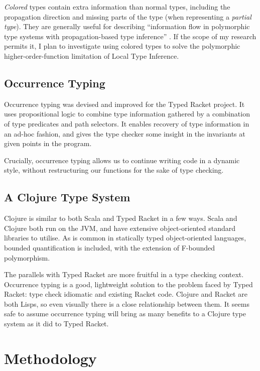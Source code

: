 \documentclass[12pt,a4paper]{article}
\begin{document}
\emph{Colored} types contain extra information than normal types, including the propagation direction
and missing parts of the type (when representing a \emph{partial type}). They are generally useful
for describing ``information flow in polymorphic type systems with propagation-based type inference''
\cite{Odersky:2001:CLT:373243.360207}. If the scope of my research permits it, I plan to investigate
using colored types to solve the polymorphic higher-order-function limitation of Local Type Inference.

\subsection{Occurrence Typing}

Occurrence typing was devised \cite{Tobin-Hochstadt:2008:DIT:1328897.1328486} and improved
\cite{Tobin-Hochstadt:2010:LTU:1932681.1863561} for the Typed Racket project. It uses propositional 
logic to combine type information gathered by a combination of type predicates and path selectors.
It enables recovery of type information in an ad-hoc fashion, and gives the type checker some insight
in the invariants at given points in the program.

Crucially, occurrence typing allows us to continue writing code in a dynamic style, without restructuring
our functions for the sake of type checking. 

\subsection{A Clojure Type System}

Clojure is similar to both Scala and Typed Racket in a few ways. Scala and Clojure
both run on the JVM, and have extensive object-oriented standard libraries to utilise.
As is common in statically typed object-oriented languages, bounded quantification is
included, with the extension of F-bounded polymorphism.

The parallels with Typed Racket are more fruitful in a type checking context.
Occurrence typing is a good, lightweight solution to the problem faced by Typed Racket:
type check idiomatic and existing Racket code. Clojure and Racket are both Lisps, so even
visually there is a close relationship between them. It seems safe to assume occurrence
typing will bring as many benefits to a Clojure type system as it did to Typed Racket.

\section{Methodology}
\end{document}
